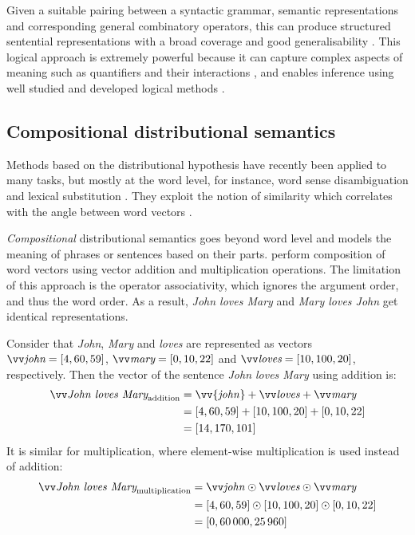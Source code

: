 Given a suitable pairing between a syntactic grammar, semantic representations and corresponding general combinatory operators, this can produce structured sentential representations with a broad coverage and good generalisability \cite{step2008:2222}. This logical approach is extremely powerful because it can capture complex aspects of meaning such as quantifiers and their interactions \cite{Copestake2005}, and enables inference using well studied and developed logical methods \cite{bos2000first}.

\subsection{Compositional distributional semantics}
\label{sec:composition}

Methods based on the distributional hypothesis have recently been applied to many tasks, but mostly at the word level, for instance, word sense disambiguation \cite{ZhitomirskyGeffet2009} and lexical substitution \cite{Thater:2010:CSR:1858681.1858778}. They exploit the notion of similarity which correlates with the angle between word vectors \cite{Turney:2010:FMV:1861751.1861756}.

\emph{Compositional} distributional semantics goes beyond word level and models the meaning of phrases or sentences based on their parts.  perform composition of word vectors using vector addition and multiplication operations. The limitation of this approach is the operator associativity, which ignores the argument order, and thus the word order. As a result, \textit{John loves Mary} and \textit{Mary loves John} get identical representations.

Consider that \textit{John}, \textit{Mary} and \textit{loves} are represented as vectors $\ov{\text{\it john}} = [4, 60, 59]$, $\ov{\text{\it mary}} = [0, 10, 22]$ and $\ov{\text{\it loves}} = [10, 100, 20]$, respectively. Then the vector of the sentence \textit{John loves Mary} using addition is:
%
\begin{align*}
  \ov{\text{\it John loves Mary}}_{\text{addition}} &= \vv{\mathit{john}} + \ov{\mathit{loves}} + \ov{\mathit{mary}} \\
                                  &= [4, 60, 59] + [10, 100, 20] + [0, 10, 22] \\
                                  &= [14, 170, 101]
\end{align*}
%
It is similar for multiplication, where element-wise multiplication is used instead of addition:
%
\begin{align*}
  \ov{\text{\it John loves Mary}}_{\text{multiplication}} &= \ov{\mathit{john}} \odot \ov{\mathit{loves}} \odot \ov{\mathit{mary}} \\
                                  &= [4, 60, 59] \odot [10, 100, 20] \odot [0, 10, 22] \\
                                  &= [0, 60\,000, 25\,960]
\end{align*}

